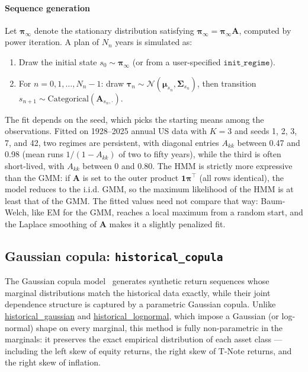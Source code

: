 \documentclass[fleqn,12pt]{report}
\newcommand{\code}[1]{\url{#1}}
\begin{document}
\paragraph*{Sequence generation}
Let $\bm{\pi}_\infty$ denote the stationary distribution satisfying
$\bm{\pi}_\infty = \bm{\pi}_\infty\bm{A}$, computed by power iteration.
A plan of $N_n$ years is simulated as:
\begin{enumerate}
    \item Draw the initial state $s_0 \sim \bm{\pi}_\infty$
          (or from a user-specified $\texttt{init\_regime}$).
    \item For $n = 0,1,\ldots,N_n-1$:
          draw $\bm{\tau}_n \sim \mathcal{N}(\bm{\mu}_{s_n},\bm{\Sigma}_{s_n})$,
          then transition $s_{n+1}\sim\mathrm{Categorical}(\bm{A}_{s_n,\cdot})$.
\end{enumerate}
The fit depends on the seed, which picks the starting means among the observations.
Fitted on 1928--2025 annual US data with $K=3$ and seeds 1, 2, 3, 7, and 42,
two regimes are persistent, with diagonal entries $A_{kk}$ between 0.47 and 0.98
(mean runs $1/(1-A_{kk})$ of two to fifty years), while the third is often
short-lived, with $A_{kk}$ between 0 and 0.80.
The HMM is strictly more expressive than the GMM: if $\bm{A}$ is set to
the outer product $\bm{1}\bm{\pi}^\top$ (all rows identical), the model
reduces to the i.i.d. GMM, so the maximum likelihood of the HMM is at least
that of the GMM.
The fitted values need not compare that way: Baum-Welch, like EM for the GMM, reaches a
local maximum from a random start, and the Laplace smoothing of $\bm{A}$ makes it a
slightly penalized fit.

\subsection{Gaussian copula: \texttt{historical\_copula}}

The Gaussian copula model~\cite{sklar1959} generates synthetic return sequences
whose marginal distributions match the historical data exactly, while their
joint dependence structure is captured by a parametric Gaussian copula.
Unlike \code{historical_gaussian} and \code{historical_lognormal}, which
impose a Gaussian (or log-normal) shape on every marginal,
this method is fully non-parametric in the marginals: it preserves
the exact empirical distribution of each asset class --- including
the left skew of equity returns, the right skew of T-Note returns,
and the right skew of inflation.
\end{document}
